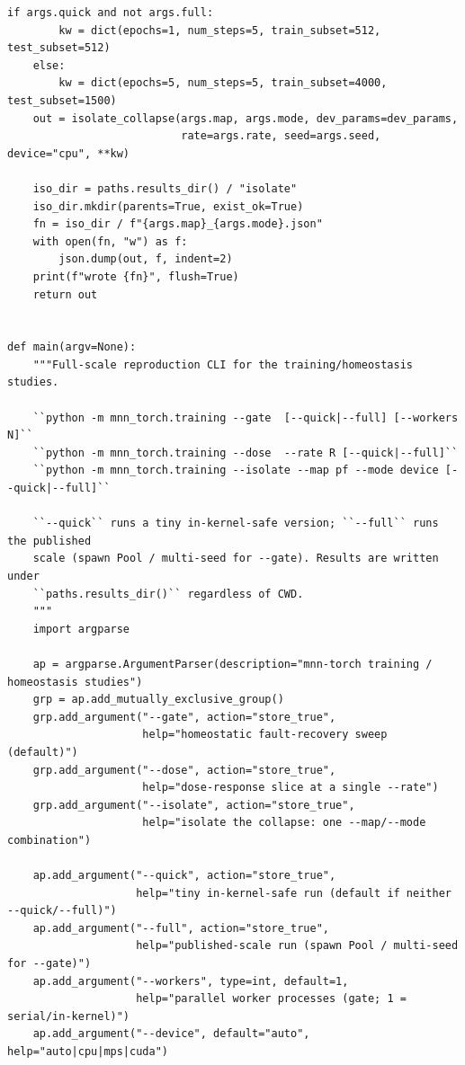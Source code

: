 \begin{lstlisting}[caption={mnn\_torch/training.py},label={lst:mnn-src-training}]
    if args.quick and not args.full:
        kw = dict(epochs=1, num_steps=5, train_subset=512, test_subset=512)
    else:
        kw = dict(epochs=5, num_steps=5, train_subset=4000, test_subset=1500)
    out = isolate_collapse(args.map, args.mode, dev_params=dev_params,
                           rate=args.rate, seed=args.seed, device="cpu", **kw)

    iso_dir = paths.results_dir() / "isolate"
    iso_dir.mkdir(parents=True, exist_ok=True)
    fn = iso_dir / f"{args.map}_{args.mode}.json"
    with open(fn, "w") as f:
        json.dump(out, f, indent=2)
    print(f"wrote {fn}", flush=True)
    return out


def main(argv=None):
    """Full-scale reproduction CLI for the training/homeostasis studies.

    ``python -m mnn_torch.training --gate  [--quick|--full] [--workers N]``
    ``python -m mnn_torch.training --dose  --rate R [--quick|--full]``
    ``python -m mnn_torch.training --isolate --map pf --mode device [--quick|--full]``

    ``--quick`` runs a tiny in-kernel-safe version; ``--full`` runs the published
    scale (spawn Pool / multi-seed for --gate). Results are written under
    ``paths.results_dir()`` regardless of CWD.
    """
    import argparse

    ap = argparse.ArgumentParser(description="mnn-torch training / homeostasis studies")
    grp = ap.add_mutually_exclusive_group()
    grp.add_argument("--gate", action="store_true",
                     help="homeostatic fault-recovery sweep (default)")
    grp.add_argument("--dose", action="store_true",
                     help="dose-response slice at a single --rate")
    grp.add_argument("--isolate", action="store_true",
                     help="isolate the collapse: one --map/--mode combination")

    ap.add_argument("--quick", action="store_true",
                    help="tiny in-kernel-safe run (default if neither --quick/--full)")
    ap.add_argument("--full", action="store_true",
                    help="published-scale run (spawn Pool / multi-seed for --gate)")
    ap.add_argument("--workers", type=int, default=1,
                    help="parallel worker processes (gate; 1 = serial/in-kernel)")
    ap.add_argument("--device", default="auto", help="auto|cpu|mps|cuda")


\end{lstlisting}

